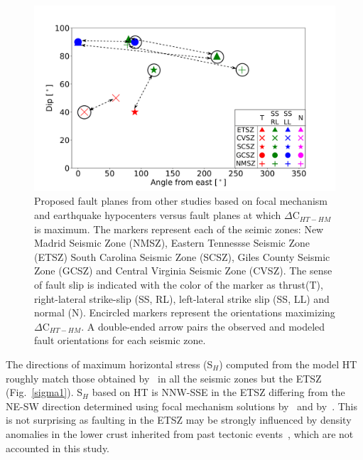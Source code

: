 \documentclass[draft,linenumbers]{agujournal2018}
\begin{document}
%
\begin{figure}[ht]
    \centering
    \includegraphics[width=0.8\linewidth]{figures/summ_stress.png}
    \caption{Proposed fault planes from other studies based on focal mechanism and earthquake hypocenters versus fault planes at which $\Delta$C$_{HT-HM}$ is maximum. The markers represent each of the seimic zones: New Madrid Seismic Zone (NMSZ), Eastern Tennessse Seismic Zone (ETSZ) South Carolina Seismic Zone (SCSZ), Giles County Seismic Zone (GCSZ) and Central Virginia Seismic Zone (CVSZ). The sense of fault slip is indicated with the color of the marker as thrust(T), right-lateral strike-slip (SS, RL), left-lateral strike slip (SS, LL) and normal (N). Encircled markers represent the orientations maximizing $\Delta$C$_{HT-HM}$. A double-ended arrow pairs the observed and modeled fault orientations for each seismic zone.}
    \label{summary}
\end{figure}
 
%
%
The directions of maximum horizontal stress (S$_H$) computed from the model HT roughly match those obtained by~\citet{levandowski2018updated} in all the seismic zones but the ETSZ (Fig.~\ref{sigma1}).  S$_{H}$ based on HT is NNW-SSE in the ETSZ differing from the NE-SW direction determined using focal mechanism solutions by~\citet{levandowski2018updated} and by~\citet{mazzotti2010state}. This is not surprising as faulting in the ETSZ may be strongly influenced by density anomalies in the lower crust inherited from past tectonic events~\citep{levandowski2018updated}, which are not accounted in this study.
\end{document}
